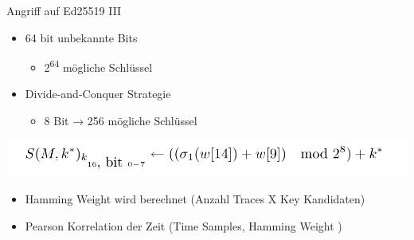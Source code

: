 \documentclass[
  11 pt,
  ignorenonframetext,
  aspectratio=43,
]{beamer}
\providecommand{\tightlist}{%
  \setlength{\itemsep}{0pt}\setlength{\parskip}{0pt}}
\begin{document}
\begin{frame}{Angriff auf Ed25519 III}
\protect\hypertarget{angriff-auf-ed25519-iii}{}
\begin{itemize}
\tightlist
\item
  64 bit unbekannte Bits

  \begin{itemize}
  \tightlist
  \item
    2\textsuperscript{64} mögliche Schlüssel
  \end{itemize}
\end{itemize}

\pause

\begin{itemize}
\tightlist
\item
  Divide-and-Conquer Strategie

  \begin{itemize}
  \tightlist
  \item
    8 Bit → 256 mögliche Schlüssel
  \end{itemize}
\end{itemize}

\pause

\includegraphics[width=\textwidth,height=0.6\textheight]{Abbildungen/keyDPA.png}

\pause

\begin{itemize}
\tightlist
\item
  Hamming Weight wird berechnet (Anzahl Traces X Key Kandidaten)
\end{itemize}

\pause

\begin{itemize}
\tightlist
\item
  Pearson Korrelation der Zeit (Time Samples, Hamming Weight )
\end{itemize}
\end{frame}
\end{document}
